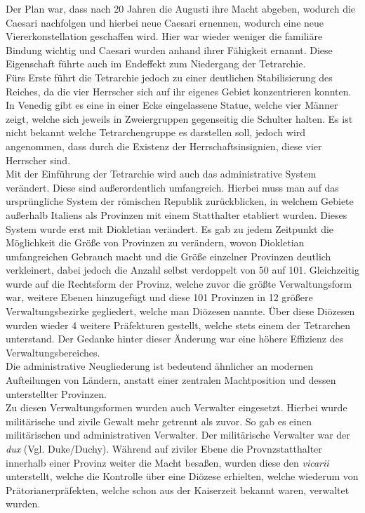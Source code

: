\documentclass{article}
\begin{document}
	Der Plan war, dass nach 20 Jahren die Augusti ihre Macht abgeben, wodurch die Caesari nachfolgen und hierbei neue Caesari ernennen, wodurch eine neue Viererkonstellation geschaffen wird. Hier war wieder weniger die familiäre Bindung wichtig und Caesari wurden anhand ihrer Fähigkeit ernannt. Diese Eigenschaft führte auch im Endeffekt zum Niedergang der Tetrarchie. \\
	Fürs Erste führt die Tetrarchie jedoch zu einer deutlichen Stabilisierung des Reiches, da die vier Herrscher sich auf ihr eigenes Gebiet konzentrieren konnten. \\
	In Venedig gibt es eine in einer Ecke eingelassene Statue, welche vier Männer zeigt, welche sich jeweils in Zweiergruppen gegenseitig die Schulter halten. Es ist nicht bekannt welche Tetrarchengruppe es darstellen soll, jedoch wird angenommen, dass durch die Existenz der Herrschaftsinsignien, diese vier Herrscher sind. \\
	Mit der Einführung der Tetrarchie wird auch das administrative System verändert. Diese sind außerordentlich umfangreich. Hierbei muss man auf das ursprüngliche System der römischen Republik zurückblicken, in welchem Gebiete außerhalb Italiens als Provinzen mit einem Statthalter etabliert wurden. Dieses System wurde erst mit Diokletian verändert. Es gab zu jedem Zeitpunkt die Möglichkeit die Größe von Provinzen zu verändern, wovon Diokletian umfangreichen Gebrauch macht und die Größe einzelner Provinzen deutlich verkleinert, dabei jedoch die Anzahl selbst verdoppelt von 50 auf 101. Gleichzeitig wurde auf die Rechtsform der Provinz, welche zuvor die größte Verwaltungsform war, weitere Ebenen hinzugefügt und diese 101 Provinzen in 12 größere Verwaltungsbezirke gegliedert, welche man Diözesen nannte. Über diese Diözesen wurden wieder 4 weitere Präfekturen gestellt, welche stets einem der Tetrarchen unterstand. Der Gedanke hinter dieser Änderung war eine höhere Effizienz des Verwaltungsbereiches. \\
	Die administrative Neugliederung ist bedeutend ähnlicher an modernen Aufteilungen von Ländern, anstatt einer zentralen Machtposition und dessen unterstellter Provinzen. \\
	Zu diesen Verwaltungsformen wurden auch Verwalter eingesetzt. Hierbei wurde militärische und zivile Gewalt mehr getrennt als zuvor. So gab es einen militärischen und administrativen Verwalter. Der militärische Verwalter war der \textit{dux} (Vgl. Duke/Duchy). Während auf ziviler Ebene die Provnzstatthalter innerhalb einer Provinz weiter die Macht besaßen, wurden diese den \textit{vicarii} unterstellt, welche die Kontrolle über eine Diözese erhielten, welche wiederum von Prätorianerpräfekten, welche schon aus der Kaiserzeit bekannt waren, verwaltet wurden. \\
\end{document}
